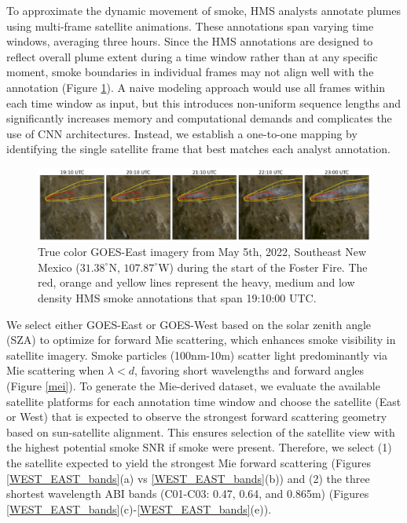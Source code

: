\documentclass{article}
\begin{document}
To approximate the dynamic movement of smoke, HMS analysts annotate plumes using multi-frame satellite animations. These annotations span varying time windows, averaging three hours. Since the HMS annotations are designed to reflect overall plume extent during a time window rather than at any specific moment, smoke boundaries in individual frames may not align well with the annotation (Figure \ref{timelapse}). A naive modeling approach would use all frames within each time window as input, but this introduces non-uniform sequence lengths and significantly increases memory and computational demands and complicates the use of CNN architectures. Instead, we establish a one-to-one mapping by identifying the single satellite frame that best matches each analyst annotation.


\begin{figure}[!htb]
    \centering
    \includegraphics[width=\linewidth]{figures/timelapse_small.png}
    \caption{True color GOES-East imagery from May 5th, 2022, Southeast New Mexico (\(31.38^{\circ}\)N, \(107.87^{\circ}\)W) during the start of the Foster Fire. The red, orange and yellow lines represent the heavy, medium and low density HMS smoke annotations that span 19:10:00 UTC.}
    \label{timelapse}
\end{figure}


We select either GOES-East or GOES-West based on the solar zenith angle (SZA) to optimize for forward Mie scattering, which enhances smoke visibility in satellite imagery. Smoke particles (100nm-10\textmu m) scatter light predominantly via Mie scattering when \(\lambda < d\), favoring short wavelengths and forward angles (Figure \ref{mei}). To generate the Mie-derived dataset, we evaluate the available satellite platforms for each annotation time window and choose the satellite (East or West) that is expected to observe the strongest forward scattering geometry based on sun-satellite alignment. This ensures selection of the satellite view with the highest potential smoke SNR if smoke were present. Therefore, we select (1) the satellite expected to yield the strongest Mie forward scattering (Figures \ref{WEST_EAST_bands}(a) vs \ref{WEST_EAST_bands}(b)) and (2) the three shortest wavelength ABI bands (C01-C03: 0.47, 0.64, and 0.865\textmu m) (Figures \ref{WEST_EAST_bands}(c)-\ref{WEST_EAST_bands}(e)).
\end{document}
